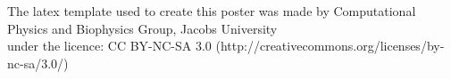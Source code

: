 \documentclass{beamer}
\begin{document}
% 

\begin{frame}[t]

\begin{columns}[t] 
  
  \begin{column}{\sepwid}\end{column}
  
  
  \begin{column}{\oneprvni} 
    
  \end{column}


  \separacnisloupec


  \begin{column}{\twodruhy} 
    
  \end{column}

  \separacnisloupec

  \begin{column}{\threetreti} 
    
  \end{column}
  
  \begin{column}{\sepwid}\end{column}
  
  \end{columns}
  \hfill {\tiny The latex template used to create this poster was made by Computational Physics and Biophysics Group, Jacobs University\\[-18pt] \hfill under the licence: CC BY-NC-SA 3.0 (http://creativecommons.org/licenses/by-nc-sa/3.0/)}
  \end{frame} %
\end{document}
